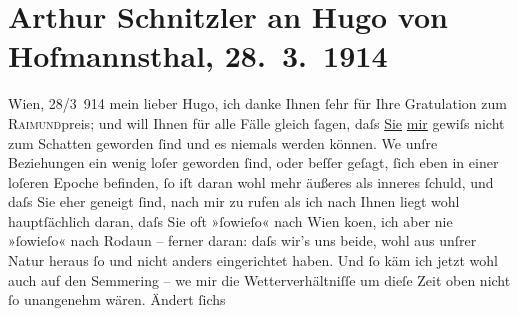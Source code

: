 

               \section[Arthur Schnitzler an Hugo von Hofmannsthal, 28. 3. 1914]{ Arthur Schnitzler an Hugo von Hofmannsthal, 28. 3. 1914}\nopagebreak{}\rehead{ }\begin{ledgroupsized}[t]{13cm}\normalsize\beginnumbering{} \toendnotes[C]{\smallbreak\pagebreak[2]} 
\toendnotes[C]{\smallbreak}\pstart
           \raggedleft{}{\pb}Wien, 28/3 914\pend
           \pstart
           mein lieber Hugo, ich danke Ihnen ſehr für Ihre Gratulation zum \textsc{Raimund}preis; und will Ihnen für alle Fälle gleich
               ſagen, daſs \uline{Sie}{ }\uline{mir} gewiſs nicht zum Schatten geworden ſind und es
               niemals werden können. We{\geminationn} unſre Beziehungen ein wenig
               loſer geworden ſind, oder beſſer geſagt, ſich \introOben{}eben\introOben{} in einer
               loſeren Epoche befinden, ſo iſt daran wohl mehr äußeres als inneres ſchuld,  und
               daſs Sie eher geneigt ſind, nach mir zu rufen als ich nach Ihnen liegt wohl
               hauptſächlich daran, daſs Sie oft »ſowieſo« nach Wien
                  ko{\geminationm}en, ich aber nie »ſowieſo« nach Rodaun – ferner daran: daſs wir’s uns beide, wohl aus unſrer
               Natur heraus ſo und nicht anders eingerichtet haben. Und ſo käm ich jetzt wohl auch
               auf den Semmering – we{\geminationn}
               mir die Wetterverhältniſſe um dieſe Zeit oben nicht ſo unangenehm wären. Ändert ſichs

\end{ledgroupsized}
